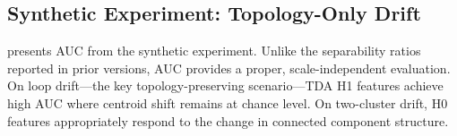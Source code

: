 \begin{table}[t]
    \centering
    \caption{AUC on \twentyng drift scenarios with \minilm and \bertbase (mean $\pm$ std). Close-category drift is substantially harder than \agnews topic drift for all methods.}
    \label{tab:newsgroups}
\end{table}

\subsection{Synthetic Experiment: Topology-Only Drift}
\label{sec:synthetic_results}

 presents AUC from the synthetic experiment. Unlike the separability ratios reported in prior versions, AUC provides a proper, scale-independent evaluation. On loop drift---the key topology-preserving scenario---TDA H1 features achieve high AUC where centroid shift remains at chance level. On two-cluster drift, H0 features appropriately respond to the change in connected component structure.

